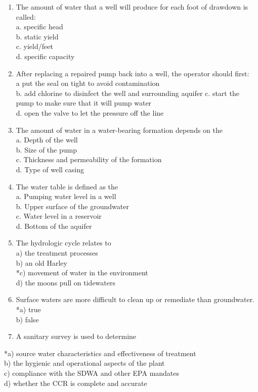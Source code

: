 \begin{enumerate}
\item The amount of water that a well will produce for each foot of drawdown is called:\\
a. specific head\\
b. static yield\\
c. yield/feet\\
d. specific capacity\\
\item After replacing a repaired pump back into a well, the operator should first:\\
a put the seal on tight to avoid contamination\\
b. add chlorine to disinfect the well and surrounding aquifer c. start the pump to make sure that it will pump water\\
d. open the valve to let the pressure off the line\\
\item The amount of water in a water-bearing formation depends on the\\
a. Depth of the well\\
b. Size of the pump\\
c. Thickness and permeability of the formation\\
d. Type of well casing 
\item The water table is defined as the\\
a. Pumping water level in a well\\
b. Upper surface of the groundwater\\
c. Water level in a reservoir\\
d. Bottom of the aquifer\\
  \item The hydrologic cycle relates to\\
a) the treatment processes\\
b) an old Harley\\
*c) movement of water in the environment\\
d) the moons pull on tidewaters\\
  \item Surface waters are more difficult to clean up or remediate than groundwater.\\
*a) true\\
b) false\\
  \item A sanitary survey is used to determine\\
\end{enumerate}
*a) source water characteristics and effectiveness of treatment\\
b) the hygienic and operational aspects of the plant\\
c) compliance with the SDWA and other EPA mandates\\
d) whether the CCR is complete and accurate\\

